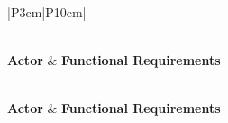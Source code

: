 \begin{longtable}{|P{3cm}|P{10cm}|}
\caption{Description of functional requirements by actor}
\label{tab:functional-requirements} \\
\hline
\textbf{Actor} & \textbf{Functional Requirements} \\
\hline
\endfirsthead

 \\
\hline
\textbf{Actor} & \textbf{Functional Requirements} \\
\hline
\endhead

\hline
{} \\
\endfoot

\hline
\endlastfoot


\end{longtable}
